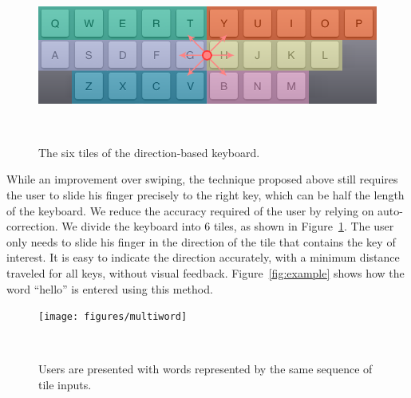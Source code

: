 \begin{figure}
  \centering

  \includegraphics[width=1\columnwidth]{figures/arrows}
  
  \caption{The six tiles of the direction-based keyboard.}
  ~\label{fig:swipeVRLayout}
\end{figure}

While an improvement over swiping, the technique proposed above still requires the user to slide his finger precisely to the right key, which can be half the length of the keyboard.  We reduce the accuracy required of the user by relying on auto-correction.  We divide the keyboard into 6 tiles, as shown in Figure~\ref{fig:swipeVRLayout}.   The user only needs to slide his finger in the direction of the tile that contains the key of interest.  It is easy to indicate the direction accurately, with a minimum distance traveled for all keys, without visual feedback.  Figure~\ref{fig:example} shows how the word ``hello'' is entered using this method. 
\begin{figure}[htb]
  \centering

  \texttt{[image: figures/multiword]}
  
  \caption{Users are presented with words represented by the same sequence of tile inputs.}
  ~\label{fig:multiword}
\end{figure}

